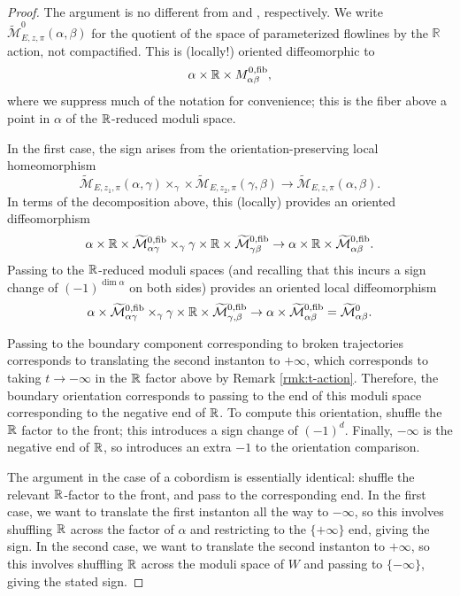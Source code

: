 \documentclass{memo-l}
\theoremstyle{definition}
\theoremstyle{remark}
\numberwithin{section}{chapter}
\numberwithin{equation}{chapter}
\begin{document}
\begin{proof}The argument is no different from \cite[Proposition~20.5.2]{KMSW} and \cite[Proposition~25.1.1]{KMSW}, respectively. We write $\widetilde{\mathcal M}^0_{E, z, \pi}(\alpha, \beta)$ for the quotient of the space of parameterized flowlines by the $\mathbb R$ action, not compactified. This is (locally!) oriented diffeomorphic to $$\alpha \times \Bbb R \times M^{0,\text{fib}}_{\alpha \beta},$$ where we suppress much of the notation for convenience; this is the fiber above a point in $\alpha$ of the $\Bbb R$-reduced moduli space. 

In the first case, the sign arises from the orientation-preserving local homeomorphism $$\widetilde{\mathcal M}_{E,z_1,\pi}(\alpha, \gamma) \times_\gamma \times \widetilde{\mathcal M}_{E,z_2,\pi}(\gamma, \beta) \to \widetilde{\mathcal M}_{E,z,\pi}(\alpha, \beta).$$ In terms of the decomposition above, this (locally) provides an oriented diffeomorphism $$\alpha \times \Bbb R \times \widetilde{\mathcal M}^{0,\text{fib}}_{\alpha \gamma} \times_\gamma \gamma \times \Bbb R \times \widetilde{\mathcal M}^{0,\text{fib}}_{\gamma \beta} \to \alpha \times \Bbb R \times \widetilde{\mathcal M}^{0,\text{fib}}_{\alpha \beta}.$$ Passing to the $\Bbb R$-reduced moduli spaces (and recalling that this incurs a sign change of $(-1)^{\dim \alpha}$ on both sides) provides an oriented local diffeomorphism $$\alpha \times \widetilde{\mathcal M}^{0,\text{fib}}_{\alpha \gamma} \times_\gamma \gamma \times \Bbb R \times \widetilde{\mathcal M}^{0,\text{fib}}_{\gamma, \beta} \to \alpha \times \widetilde{\mathcal M}^{0,\text{fib}}_{\alpha \beta} = \widetilde{\mathcal M}^0_{\alpha \beta}.$$ 

Passing to the boundary component corresponding to broken trajectories corresponds to translating the second instanton to $+\infty$, which corresponds to taking $t \to -\infty$ in the $\Bbb R$ factor above by Remark \ref{rmk:t-action}. Therefore, the boundary orientation corresponds to passing to the end of this moduli space corresponding to the negative end of $\Bbb R$. To compute this orientation, shuffle the $\Bbb R$ factor to the front; this introduces a sign change of $(-1)^d$. Finally, $-\infty$ is the negative end of $\Bbb R$, so introduces an extra $-1$ to the orientation comparison. 

The argument in the case of a cobordism is essentially identical: shuffle the relevant $\Bbb R$-factor to the front, and pass to the corresponding end. In the first case, we want to translate the first instanton all the way to $-\infty$, so this involves shuffling $\Bbb R$ across the factor of $\alpha$ and restricting to the $\{+\infty\}$ end, giving the sign. In the second case, we want to translate the second instanton to $+\infty$, so this involves shuffling $\Bbb R$ across the moduli space of $W$ and passing to $\{-\infty\}$, giving the stated sign.
\end{proof}
\end{document}
